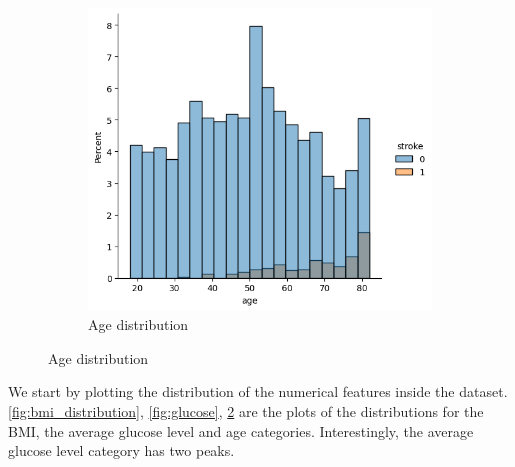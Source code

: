\documentclass[twocolumn, 9pt]{extarticle}
\begin{document}
\begin{figure}[ht]
\begin{subfigure}[b]{\linewidth}
\centering
\includegraphics[scale=0.4]{images/age_distribution.png}
\caption{Age distribution}
\label{fig:age_distribution}
\end{subfigure}
\end{figure}

We start by plotting the distribution of the numerical features inside the dataset. \ref{fig:bmi_distribution}, \ref{fig:glucose}, \ref{fig:age_distribution} are the plots of the distributions for the BMI, the average glucose level and age categories. Interestingly, the average glucose level category has two peaks.
\end{document}
